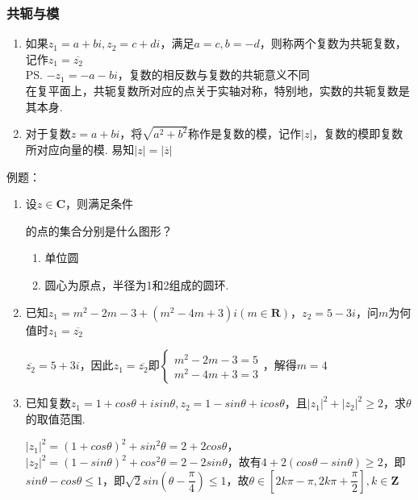 \subsubsection*{共轭与模}
\begin{enumerate}
    \item 如果$z_1 = a + bi, z_2 = c+di$，满足$a = c, b = -d$，则称两个复数为共轭复数，记作$z_1 = \overline{z_2}$ \\
    \ps $-z_1 = -a - bi$，复数的相反数与复数的共轭意义不同 \\
    在复平面上，共轭复数所对应的点关于实轴对称，特别地，实数的共轭复数是其本身.
    \item 对于复数$z = a+bi$，将$\sqrt{a^2+b^2}$称作是复数的模，记作$|z|$，复数的模即复数所对应向量的模. 易知$|z| = |\overline{z}|$
\end{enumerate}
例题：
\begin{enumerate}
    \item 设$z \in \mathbf{C}$，则满足条件的点的集合分别是什么图形？
    \begin{jieda}
        \begin{enumerate}
            \item 单位圆
            \item 圆心为原点，半径为1和2组成的圆环.
        \end{enumerate}
    \end{jieda}
    \item 已知$z_1 = m^2 - 2m - 3 + (m^2-4m+3)i (m \in \mathbf{R})$，$z_2 = 5 - 3i$，问$m$为何值时$z_1 = \overline{z_2}$
    \begin{jieda}
        $\overline{z_2} = 5+3i$，因此$z_1 = \overline{z_2}$即$\left \{ \begin{array}{l}
             m^2-2m-3 = 5 \\
             m^2-4m+3 = 3
        \end{array} \right.$，解得$m = 4$
    \end{jieda}
    \item 已知复数$z_1 = 1 + cos\theta + i sin\theta, z_2 = 1 - sin \theta + i cos\theta$，且$|z_1|^2+|z_2|^2 \geq 2$，求$\theta$的取值范围.
    \begin{jieda}
            $|z_1|^2 = (1+cos\theta)^2 + sin^2\theta = 2 + 2cos\theta$，$|z_2|^2 = (1-sin\theta)^2 + cos^2\theta = 2 - 2sin\theta$，故有$4 + 2(cos\theta - sin\theta) \geq 2$，即$sin\theta - cos\theta \leq 1$，即$\sqrt{2}sin\left(\theta - \dfrac{\pi}{4}\right) \leq 1$，故$\theta \in \left[2k\pi - \pi, 2k\pi + \dfrac{\pi}{2}\right], k \in \mathbf{Z}$
    \end{jieda}
\end{enumerate}
